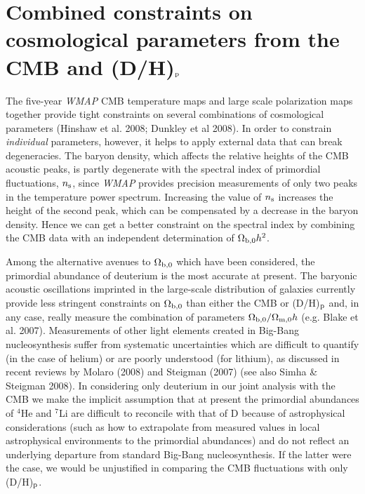 \documentclass[useAMS,usenatbib]{mn2e}
\begin{document}
\section{Combined constraints on cosmological parameters
from the CMB and (D/H)$_{\rm p}$}
\label{sec:BBN_and_CMB}



The five-year \textit{WMAP} CMB temperature maps and
large scale polarization maps together provide tight constraints
on several combinations of cosmological parameters
(Hinshaw et al. 2008; Dunkley et al 2008).
In order to constrain \emph{individual} parameters, however,
it helps to apply external data that can break degeneracies.
The baryon density, which affects the relative heights of the CMB acoustic peaks,
is partly degenerate with the spectral index of primordial fluctuations, $n_{\rm s}$,
since \textit{WMAP} provides precision measurements of only two peaks in the temperature
power spectrum. Increasing the value of $n_{\rm s}$
increases the height of the second peak,
which can be compensated
by a decrease in the baryon density.
Hence we can get a better constraint on the spectral index
by combining the CMB data with an independent determination
of  $\Omega_{\rm b,0} h^2$.


Among the alternative avenues to $\Omega_{\rm b,0}$ which have been considered,
the primordial abundance of deuterium is the most accurate at present.
The baryonic acoustic oscillations imprinted
in the large-scale distribution of galaxies currently
provide less stringent constraints on $\Omega_{\rm b,0}$
than either the CMB or (D/H)$_{\rm p}$
and, in any case, really measure the combination of
parameters $\Omega_{\rm b,0} /\Omega_{\rm m,0} h$ (e.g. Blake et al. 2007).
Measurements of other light elements
created in Big-Bang nucleosynthesis
suffer from systematic uncertainties which are difficult to quantify
(in the case of helium) or are poorly understood (for lithium), 
as discussed in recent reviews by Molaro (2008) and Steigman (2007)
(see also Simha \& Steigman 2008). 
In considering only deuterium in our joint analysis
with the CMB we make the implicit assumption that
at present the primordial abundances of  $^4$He and $^7$Li
are difficult to reconcile with that of D because of
astrophysical considerations (such as how to extrapolate
from measured values in local astrophysical environments
to the primordial abundances) and do not reflect
an underlying departure from standard Big-Bang nucleosynthesis.
If the latter were the case, we would be unjustified in
comparing the CMB fluctuations with only (D/H)$_{\rm p}$.
\end{document}
